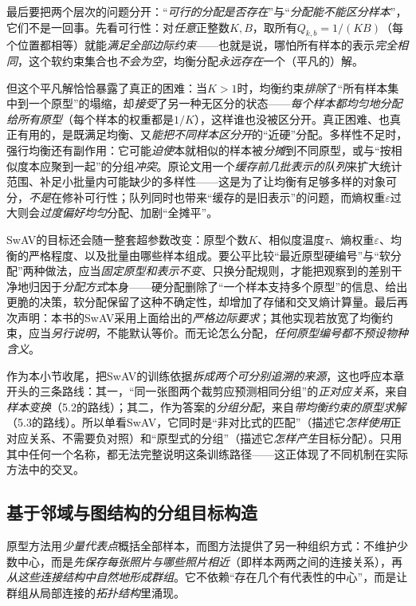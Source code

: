 最后要把两个层次的问题分开：“\emph{可行的分配是否存在}”与“\emph{分配能不能区分样本}”，它们不是一回事。先看可行性：对\emph{任意}正整数$K,B$，取所有$Q_{k,b}=1/(KB)$（每个位置都相等）就能\emph{满足全部边际约束}——也就是说，哪怕所有样本的表示\emph{完全相同}，这个软约束集合也\emph{不会为空}，均衡分配\emph{永远存在}一个（平凡的）解。

但这个平凡解恰恰暴露了真正的困难：当$K>1$时，均衡约束\emph{排除}了“所有样本集中到一个原型”的塌缩，却\emph{接受}了另一种无区分的状态——\emph{每个样本都均匀地分配给所有原型}（每个样本的权重都是$1/K$），这样谁也没被区分开。真正困难、也真正有用的，是既满足均衡、又\emph{能把不同样本区分开}的“近硬”分配。多样性不足时，强行均衡还有副作用：它可能\emph{迫使}本就相似的样本被\emph{分摊}到不同原型，或与“按相似度本应聚到一起”的分组\emph{冲突}。原论文用一个\emph{缓存前几批表示的队列}来扩大统计范围、补足小批量内可能缺少的多样性——这是为了让均衡有足够多样的对象可分，\emph{不是}在修补可行性；队列同时也带来“缓存的是旧表示”的问题，而熵权重$\varepsilon$过大则会\emph{过度偏好均匀}分配、加剧“全摊平”。

SwAV的目标还会随一整套超参数改变：原型个数$K$、相似度温度$\tau$、熵权重$\varepsilon$、均衡的严格程度、以及批量由哪些样本组成。要公平比较“最近原型硬编号”与“软分配”两种做法，应当\emph{固定原型和表示不变}、只换分配规则，才能把观察到的差别干净地归因于\emph{分配方式}本身——硬分配删除了“一个样本支持多个原型”的信息、给出更脆的决策，软分配保留了这种不确定性，却增加了存储和交叉熵计算量。最后再次声明：本书的SwAV采用上面给出的\emph{严格边际要求}；其他实现若放宽了均衡约束，应当\emph{另行说明}，不能默认等价。而无论怎么分配，\emph{任何原型编号都不预设物种含义}。

作为本小节收尾，把SwAV的训练依据\emph{拆成两个可分别追溯的来源}，这也呼应本章开头的三条路线：其一，“同一张图两个裁剪应预测相同分组”的\emph{正对应关系}，来自\emph{样本变换}（5.2的路线）；其二，作为答案的\emph{分组分配}，来自\emph{带均衡约束的原型求解}（5.3的路线）。所以单看SwAV，它同时是“非对比式的匹配”（描述它\emph{怎样使用}正对应关系、不需要负对照）和“原型式的分组”（描述它\emph{怎样产生}目标分配）。只用其中任何一个名称，都无法完整说明这条训练路径——这正体现了不同机制在实际方法中的交叉。

\subsection{基于邻域与图结构的分组目标构造}
\label{sec:data-derived-knowledge-graph-targets}

原型方法用\emph{少量代表点}概括全部样本，而图方法提供了另一种组织方式：不维护少数中心，而是\emph{先保存每张照片与哪些照片相近}（即样本两两之间的连接关系），再\emph{从这些连接结构中自然地形成群组}。它不依赖“存在几个有代表性的中心”，而是让群组从局部连接的\emph{拓扑结构}里涌现。

